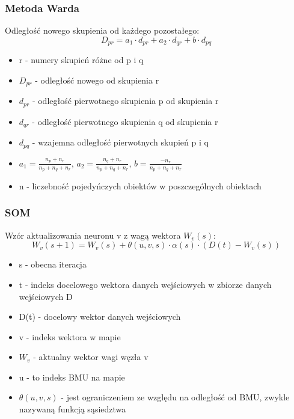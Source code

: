 \documentclass{article}
\begin{document}
        \subsubsection*{Metoda Warda}
            Odległość nowego skupienia od każdego pozostałego: 
            \begin{equation*}
                D_{pr} = a_{1}\cdot d_{pr} + a_{2}\cdot d_{qr} + b\cdot d_{pq}
            \end{equation*}
            \begin{itemize}
                \item r - numery skupień różne od p i q
                \item $D_{pr}$ - odległość nowego od skupienia r
                \item $d_{pr}$ - odległość pierwotnego skupienia p od skupienia r
                \item $d_{qr}$ - odległość pierwotnego skupienia q od skupienia r
                \item $d_{pq}$ - wzajemna odległość pierwotnych skupień p i q
                \item $a_{1} = \frac{n_{p} + n_{r}}{n_{p} + n_{q} + n_{r}}$, $a_{2} = \frac{n_{q} + n_{r}}{n_{p} + n_{q} + n_{r}}$, $b = \frac{-n_{r}}{n_{p} + n_{q} + n_{r}}$
                \item n - liczebność pojedyńczych obiektów w poszczególnych obiektach
            \end{itemize}
        \subsubsection*{SOM}
        Wzór aktualizowania neuronu v z wagą wektora $W_v(s)$:
            \begin{equation*}
                W_v(s+1) = W_v(s) + \theta(u,v,s) \cdot \alpha(s) \cdot (D(t)-W_v(s))
            \end{equation*}
            \begin{itemize}
                \item s - obecna iteracja
                \item t - indeks docelowego wektora danych wejściowych w zbiorze danych wejściowych D 
                \item D(t) - docelowy wektor danych wejściowych
                \item v - indeks wektora w mapie
                \item $W_v$ - aktualny wektor wagi węzła v
                \item u - to indeks BMU na mapie
                \item ${\theta(u,v,s)}$ - jest ograniczeniem ze względu na odległość od BMU, zwykle nazywaną funkcją sąsiedztwa
            \end{itemize}
\end{document}
